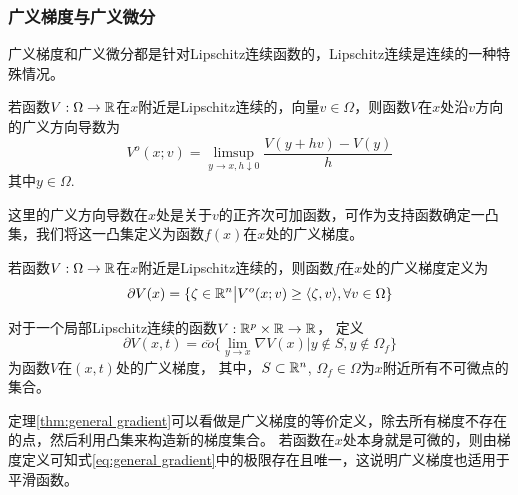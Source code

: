 \subsubsection{广义梯度与广义微分}

广义梯度和广义微分都是针对Lipschitz连续函数的，Lipschitz连续是连续的一种特殊情况。

\begin{definition}[广义方向导数]\cite{clarkeOptimizationNonsmoothAnalysis1990}
    若函数$V:\Omega\to\mathbb{R}$在$x$附近是Lipschitz连续的，向量$v\in\Omega$，则函数$V$在$x$处沿$v$方向的广义方向导数为
    \begin{equation}
        V^o(x;v)=
        \limsup_{y\to x ,h\downarrow 0} 
        \frac{V(y+hv)-V(y)}{h}
    \end{equation}
    其中$y\in\Omega$.
\end{definition}
这里的广义方向导数在$x$处是关于$v$的正齐次可加函数，可作为支持函数确定一凸集\cite{clarkeOptimizationNonsmoothAnalysis1990}，我们将这一凸集定义为函数$f(x)$在$x$处的广义梯度。

\begin{definition}[广义梯度]\cite{clarkeOptimizationNonsmoothAnalysis1990}
    若函数$V:\Omega\to\mathbb{R}$在$x$附近是Lipschitz连续的，则函数$f$在$x$处的广义梯度定义为
    \begin{equation}
        \partial V(x)=
        \{\zeta \in\mathbb{R}^n \big|  
        V^o(x;v)\geq \langle\zeta,v\rangle, \forall v\in\Omega\}
    \end{equation}
\end{definition}

\begin{theorem}[广义梯度的计算]
    \cite{clarkeOptimizationNonsmoothAnalysis1990}
    \label{thm:general gradient}
    对于一个局部Lipschitz连续的函数$V:\mathbb{R}^p\times \mathbb{R}\to \mathbb{R}$，
    定义
    \begin{equation}
        \label{eq:general gradient}
        \partial V(x,t)=\overline{co}\{\lim_{y\to x}\nabla V(x)|
        y\notin S,
        y\notin \Omega_f\}
    \end{equation}
    为函数$V$在$(x,t)$处的广义梯度，
    其中，$S\subset \mathbb{R}^n$, $\Omega_f\in\Omega$为$x$附近所有不可微点的集合。
\end{theorem}
定理\ref{thm:general gradient}可以看做是广义梯度的等价定义，除去所有梯度不存在的点，然后利用凸集来构造新的梯度集合。
若函数在$x$处本身就是可微的，则由梯度定义可知式\eqref{eq:general gradient}中的极限存在且唯一，这说明广义梯度也适用于平滑函数。

